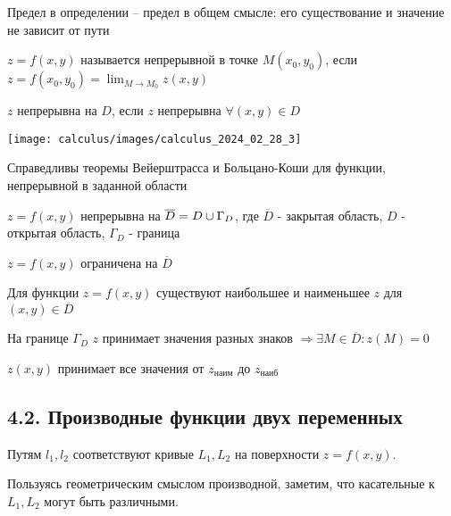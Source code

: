 \documentclass[12pt]{article}
\begin{document}
    Предел в определении -- предел в общем смысле: его существование и значение не зависит от пути

    \hypertarget{continuityoffunctionoftwovariables}{}
    \Def $z = f(x, y)$ называется непрерывной в точке $M(x_0, y_0)$, если $z = f(x_0, y_0) = \lim_{M \to M_0} z(x, y)$

    $z$ непрерывна на $D$, если $z$ непрерывна $\forall (x, y) \in D$

    \begin{center}
        \texttt{[image: calculus/images/calculus\_2024\_02\_28\_3]}
    \end{center}

    \Nota Справедливы теоремы Вейерштрасса и Больцано-Коши для функции, непрерывной в заданной области

    $z = f(x, y)$ непрерывна на $\overline{D} = D \cup \Gamma_D$, где $\overline{D}$ - закрытая область, $D$ - открытая область, $\Gamma_D$ - граница

    \begin{MyTheorem}
         $z = f(x, y)$ ограничена на $\overline{D}$
    \end{MyTheorem}

    \begin{MyTheorem}
         Для функции $z = f(x, y)$ существуют наибольшее и наименьшее $z$ для $(x, y) \in \overline{D}$
    \end{MyTheorem}

    \begin{MyTheorem}
         На границе $\Gamma_D$ $z$ принимает значения разных знаков $\Longrightarrow \exists M \in \overline{D} : z(M) = 0$
    \end{MyTheorem}

    \begin{MyTheorem}
         $z(x, y)$ принимает все значения от $z_{\text{наим}}$ до $z_{\text{наиб}}$
    \end{MyTheorem}


    \subsection{4.2. Производные функции двух переменных}

    Путям $l_1, l_2$ соответствуют кривые $L_1, L_2$ на поверхности $z = f(x, y)$.

    Пользуясь геометрическим смыслом производной, заметим, что касательные к $L_1, L_2$ могут быть различными.
\end{document}

